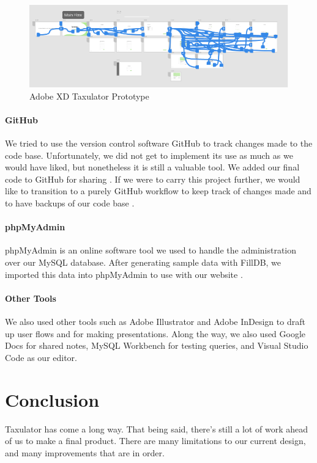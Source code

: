 \documentclass[sigconf]{acmart}
\begin{document}
\begin{figure}[H]
  \includegraphics[width=\linewidth]{Images/Prototype.png}
  \caption{Adobe XD Taxulator Prototype}
  \centering
  \label{Prototype}
\end{figure}

\paragraph{GitHub}
We tried to use the version control software GitHub to track changes made to the code base. Unfortunately, we did not get to implement its use as much as we would have liked, but nonetheless it is still a valuable tool. We added our final code to GitHub for sharing \cite{TaxulatorCode}. If we were to carry this project further, we would like to transition to a purely GitHub workflow to keep track of changes made and to have backups of our code base \cite{GitHub}.

\paragraph{phpMyAdmin}
phpMyAdmin is an online software tool we used to handle the administration over our MySQL database. After generating sample data with FillDB, we imported this data into phpMyAdmin to use with our website \cite{phpMyAdmin}.

\paragraph{Other Tools}
We also used other tools such as Adobe Illustrator \cite{Illustrator} and Adobe InDesign \cite{InDesign} to draft up user flows and for making presentations. Along the way, we also used Google Docs \cite{GDocs} for shared notes, MySQL Workbench \cite{Workbench} for testing queries, and Visual Studio Code \cite{VSCode} as our editor.

\section{Conclusion}
Taxulator has come a long way. That being said, there’s still a lot of work ahead of us to make a final product. There are many limitations to our current design, and many improvements that are in order.
\end{document}
